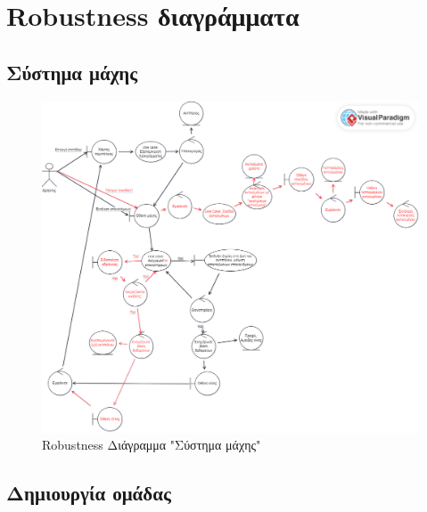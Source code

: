 \section{Robustness διαγράμματα}

\subsection{Σύστημα μάχης}

\begin{figure}[!htb]
  \begin{center}
    \includegraphics[width=\textwidth]{robust_battle_system.png}
    \caption{Robustness Διάγραμμα "Σύστημα μάχης"}
    \label{}
    \end{center}
\end{figure}
\newpage

\subsection{Δημιουργία ομάδας}

